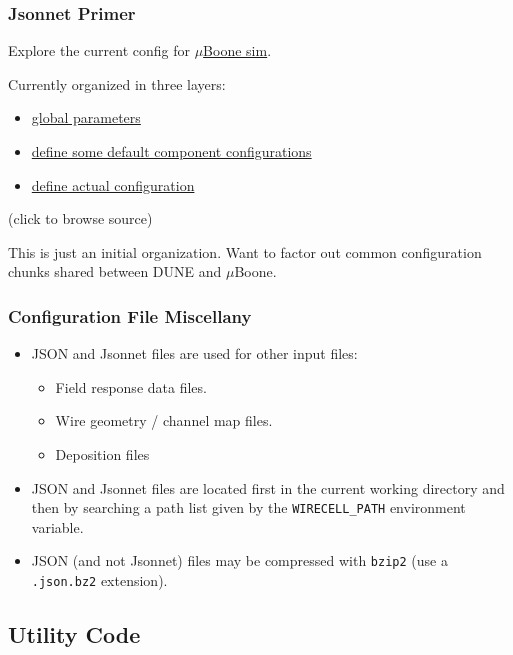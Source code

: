 \documentclass[xcolor=dvipsnames]{beamer}
\begin{document}
\begin{frame}
  \frametitle{Jsonnet Primer}
  Explore the current config for
  \href{https://github.com/WireCell/wire-cell-cfg/tree/master/uboone}{$\mu$Boone
    sim}.

  \vfill

  Currently organized in three layers:
  \begin{itemize}
  \item \href{https://github.com/WireCell/wire-cell-cfg/blob/master/uboone/globals.jsonnet}{global parameters}
  \item \href{https://github.com/WireCell/wire-cell-cfg/blob/master/uboone/components.jsonnet}{define some default component configurations}
  \item \href{https://github.com/WireCell/wire-cell-cfg/blob/master/uboone/fourdee.jsonnet}{define actual configuration}
  \end{itemize}
  (click to browse source)

  \vfill

  This is just an initial organization.  Want to factor out
  common configuration chunks shared between DUNE and $\mu$Boone.

\end{frame}

\begin{frame}
  \frametitle{Configuration File Miscellany}
  \begin{itemize}
  \item JSON and Jsonnet files are used for other input files:
    \begin{itemize}
    \item Field response data files.
    \item Wire geometry / channel map files.
    \item Deposition files
    \end{itemize}
  \item JSON and Jsonnet files are located first in the current
    working directory and then by searching a path list given by the
    \texttt{WIRECELL\_PATH} environment variable.
  \item JSON (and not Jsonnet) files may be compressed with \texttt{bzip2}
    (use a \texttt{.json.bz2} extension).
  \end{itemize}
\end{frame}

\subsection{Utility Code}
\end{document}

